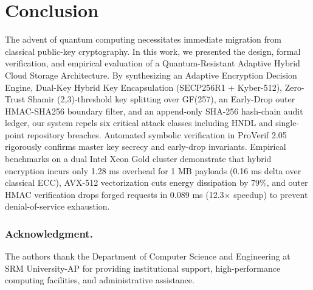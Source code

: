 \documentclass{llncs}
\begin{document}
\section{Conclusion}
The advent of quantum computing necessitates immediate migration from classical public-key cryptography. In this work, we presented the design, formal verification, and empirical evaluation of a Quantum-Resistant Adaptive Hybrid Cloud Storage Architecture. By synthesizing an Adaptive Encryption Decision Engine, Dual-Key Hybrid Key Encapsulation (SECP256R1 + Kyber-512), Zero-Trust Shamir (2,3)-threshold key splitting over GF(257), an Early-Drop outer HMAC-SHA256 boundary filter, and an append-only SHA-256 hash-chain audit ledger, our system repels six critical attack classes including HNDL and single-point repository breaches. Automated symbolic verification in ProVerif 2.05 rigorously confirms master key secrecy and early-drop invariants. Empirical benchmarks on a dual Intel Xeon Gold cluster demonstrate that hybrid encryption incurs only 1.28 ms overhead for 1 MB payloads (0.16 ms delta over classical ECC), AVX-512 vectorization cuts energy dissipation by 79\%, and outer HMAC verification drops forged requests in 0.089 ms (12.3$\times$ speedup) to prevent denial-of-service exhaustion.

\subsubsection*{Acknowledgment.}
The authors thank the Department of Computer Science and Engineering at SRM University-AP for providing institutional support, high-performance computing facilities, and administrative assistance.

%
%


\end{document}
